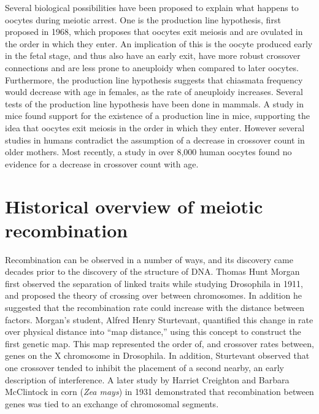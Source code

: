Several biological possibilities have been proposed to explain what happens to oocytes during meiotic arrest.
One is the production line hypothesis, first proposed in 1968\cite{Henderson1968}, which proposes that oocytes exit meiosis and are ovulated in the order in which they enter.
An implication of this is the oocyte produced early in the fetal stage, and thus also have an early exit, have more robust crossover connections and are less prone to aneuploidy when compared to later oocytes.
Furthermore, the production line hypothesis suggests that chiasmata frequency would decrease with age in females, as the rate of aneuploidy increases.
Several tests of the production line hypothesis have been done in mammals.
A study in mice found support for the existence of a production line in mice\cite{Polani1991}, supporting the idea that oocytes exit meiosis in the order in which they enter.
However several studies in humans contradict the assumption of a decrease in crossover count in older mothers\cite{Kong2004,Martin2015}.
Most recently, a study in over 8,000 human oocytes found no evidence for a decrease in crossover count with age.




\section{Historical overview of meiotic recombination}

Recombination can be observed in a number of ways, and its discovery came decades prior to the discovery of the structure of DNA.
Thomas Hunt Morgan first observed the separation of linked traits while studying Drosophila in 1911\cite{Morgan1911}, and proposed the theory of crossing over between chromosomes.
In addition he suggested that the recombination rate could increase with the distance between factors.
Morgan's student, Alfred Henry Sturtevant, quantified this change in rate over physical distance into ``map distance,'' using this concept to construct the first genetic map.
This map represented the order of, and crossover rates between, genes on the X chromosome in Drosophila\cite{Sturtevant1913}.
In addition, Sturtevant observed that one crossover tended to inhibit the placement of a second nearby, an early description of interference.
A later study by Harriet Creighton and Barbara McClintock in corn (\textit{Zea mays}) in 1931 demonstrated that recombination between genes was tied to an exchange of chromosomal segments\cite{Creighton1931}.

